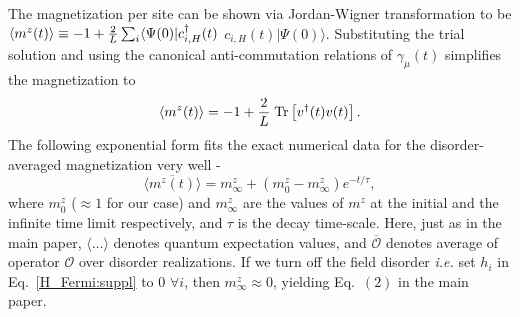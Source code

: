 \documentclass[aps,prl, notitlepage]{revtex4-1}
\begin{document}
The magnetization per site can be shown via Jordan-Wigner transformation to be $\langle m^z(t)\rangle\equiv -1 + {2 \over L}\sum_i \langle \Psi(0) | c^\dagger_{i,H} (t)$ $c_{i,H}(t) |\Psi(0)\rangle$. Substituting the trial solution and using the canonical anti-commutation relations of $\gamma_\mu(t)$ simplifies the magnetization to 
\begin{equation}
 \label{eq:mag}
\langle m^z(t)\rangle = -1+\frac{2}{L} \; {\rm Tr}\left[ {v}^\dagger(t) {v}(t)\right].
\end{equation}
\noindent
The following exponential form fits the exact numerical data for the disorder-averaged magnetization very well - 
\begin{equation}
\label{eq:mfit}
\overline {\langle m^{z}(t)\rangle}  =  m^z_{\infty} + \left(m^{z}_{0} - m^z_{\infty} \right)e^{-t/\tau},
\end{equation}
\noindent where $m^{z}_{0}$ ($ \approx 1$ for our case) and $m^{z}_{\infty}$ are the values of $m^z$
at the initial and the infinite time limit respectively, and $\tau$ is the decay time-scale. 
Here, just as in the main paper,  $\langle \dots \rangle$ denotes quantum expectation values, 
and $\overline{\mathcal{O}}$ denotes average of operator $\mathcal{O}$ over disorder realizations. If we turn off the field disorder
\textit{i.e.} set $h_i$ in Eq.~\ref{H_Fermi:suppl} to $0$ $\forall i$, then $m^z_{\infty}\approx0$, yielding Eq.~$(2)$ in the main paper. 
\end{document}

